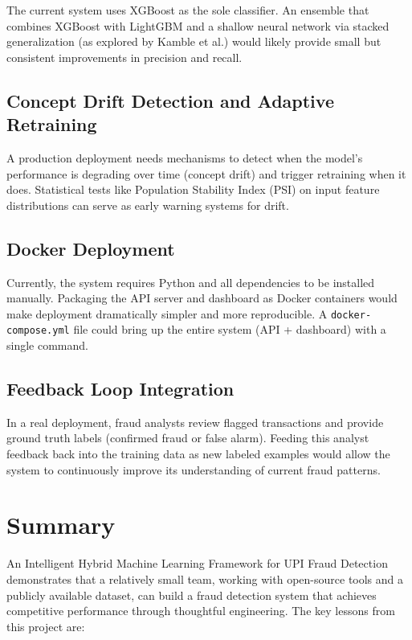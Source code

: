 The current system uses XGBoost as the sole classifier. An ensemble that combines XGBoost with LightGBM and a shallow neural network via stacked generalization (as explored by Kamble et al.) would likely provide small but consistent improvements in precision and recall.

\subsection{Concept Drift Detection and Adaptive Retraining}

A production deployment needs mechanisms to detect when the model's performance is degrading over time (concept drift) and trigger retraining when it does. Statistical tests like Population Stability Index (PSI) on input feature distributions can serve as early warning systems for drift.

\subsection{Docker Deployment}

Currently, the system requires Python and all dependencies to be installed manually. Packaging the API server and dashboard as Docker containers would make deployment dramatically simpler and more reproducible. A \texttt{docker-compose.yml} file could bring up the entire system (API + dashboard) with a single command.

\subsection{Feedback Loop Integration}

In a real deployment, fraud analysts review flagged transactions and provide ground truth labels (confirmed fraud or false alarm). Feeding this analyst feedback back into the training data as new labeled examples would allow the system to continuously improve its understanding of current fraud patterns.

\section{Summary}

An Intelligent Hybrid Machine Learning Framework for UPI Fraud Detection demonstrates that a relatively small team, working with open-source tools and a publicly available dataset, can build a fraud detection system that achieves competitive performance through thoughtful engineering. The key lessons from this project are:

